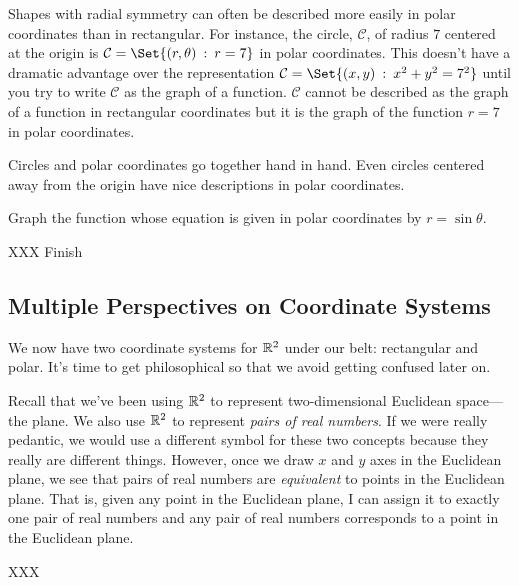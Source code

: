 Shapes with radial symmetry can often be described more easily in polar coordinates than
in rectangular.  For instance, the circle, $\mathcal C$, of radius $7$ centered at the origin is
$\mathcal C=\Set{(r,\theta)\given r=7}$ in polar coordinates.  This doesn't have a dramatic
advantage over the representation $\mathcal C=\Set{(x,y)\given x^2+y^2=7^2}$ until you try to write
$\mathcal C$ as the graph of a function.  $\mathcal C$ cannot be described as the graph of a function
in rectangular coordinates but it is the graph of the function $r=7$ in polar coordinates.

Circles and polar coordinates go together hand in hand.  Even circles centered away from the origin
have nice descriptions in polar coordinates.
\begin{example}
	Graph the function whose equation is given in polar coordinates by $r=\sin\theta$.

	XXX Finish
\end{example}

\subsection{Multiple Perspectives on Coordinate Systems}

We now have two coordinate systems for $\mathbb{R}^2$ under our belt: rectangular and polar.  
It's time to get philosophical so that we avoid getting confused later on.

Recall that we've been using $\mathbb{R}^2$ to represent two-dimensional Euclidean space---the plane.
We also use $\mathbb{R}^2$ to represent \emph{pairs of real numbers}.  If we were really pedantic,
we would use a different symbol for these two concepts because they really are different things.
However, once we draw $x$ and $y$ axes in the Euclidean plane, we see that pairs of real numbers
are \emph{equivalent} to points in the Euclidean plane.  That is, given any point in the Euclidean
plane, I can assign it to exactly one pair of real numbers and any pair of real numbers corresponds
to a point in the Euclidean plane.

XXX


